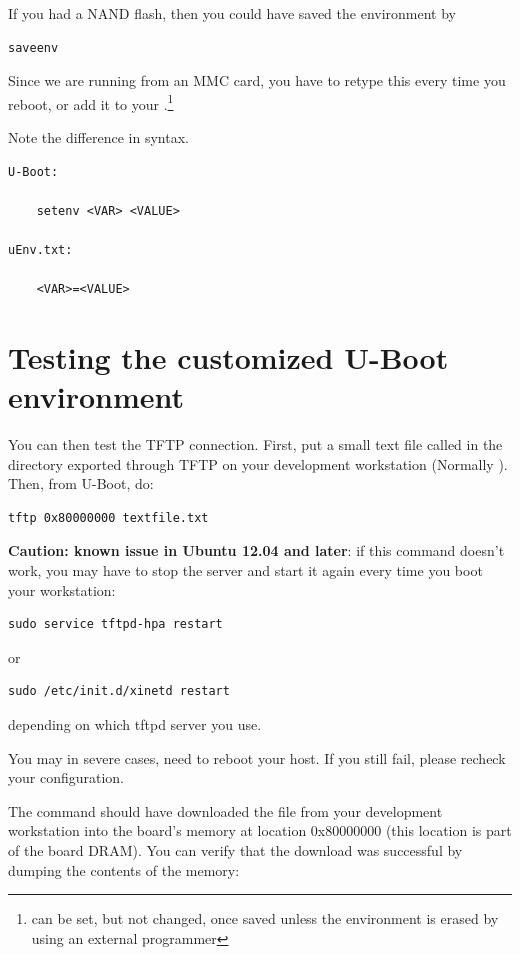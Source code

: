 If you had a NAND flash, then you could have saved the environment by

\begin{verbatim}
saveenv
\end{verbatim}

Since we are running from an MMC card, you have to retype this every time you reboot,
or add it to your .\footnote{ can be set, but not changed,
once saved unless the environment is erased by using an external programmer}

Note the difference in syntax.
\begin{lstlisting}
U-Boot:

	setenv <VAR> <VALUE>

uEnv.txt:

	<VAR>=<VALUE>

\end{lstlisting}

\section{Testing the customized U-Boot environment}

You can then test the TFTP connection. First, put a small text file called
 in the directory exported through TFTP on your development
workstation (Normally ). Then, from U-Boot, do:

\begin{verbatim}
tftp 0x80000000 textfile.txt
\end{verbatim}

{\bf Caution: known issue in Ubuntu 12.04 and later}:
if this command doesn't work, you may have to stop the server
and start it again every time you boot your workstation:

\begin{verbatim}
sudo service tftpd-hpa restart
\end{verbatim}

or

\begin{verbatim}
sudo /etc/init.d/xinetd restart
\end{verbatim}

depending on which tftpd server you use.

You may in severe cases, need to reboot your host.
If you still fail, please recheck your configuration.

The  command should have downloaded
the  file from your development
workstation into the board's memory at location 0x80000000 (this
location is part of the board DRAM). You can verify that the download
was successful by dumping the contents of the memory:

